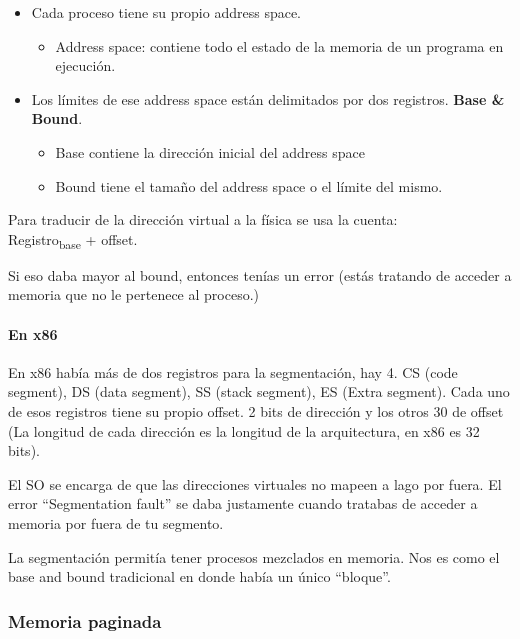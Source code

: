 \documentclass{article}
\begin{document}
\begin{itemize}
\item
  Cada proceso tiene su propio address space.

  \begin{itemize}
  \item
    Address space: contiene todo el estado de la memoria de un programa
    en ejecución.
  \end{itemize}
\item
  Los límites de ese address space están delimitados por dos registros.
  \textbf{Base \& Bound}.

  \begin{itemize}
  \item
    Base contiene la dirección inicial del address space
  \item
    Bound tiene el tamaño del address space o el límite del mismo.
  \end{itemize}
\end{itemize}

Para traducir de la dirección virtual a la física se usa la cuenta:\\
Registro\textsubscript{base} + offset.

Si eso daba mayor al bound, entonces tenías un error (estás tratando de
acceder a memoria que no le pertenece al proceso.)

\paragraph{En x86}\label{en-x86}

En x86 había más de dos registros para la segmentación, hay 4. CS (code
segment), DS (data segment), SS (stack segment), ES (Extra segment).
Cada uno de esos registros tiene su propio offset. 2 bits de dirección y
los otros 30 de offset (La longitud de cada dirección es la longitud de
la arquitectura, en x86 es 32 bits).

El SO se encarga de que las direcciones virtuales no mapeen a lago por
fuera. El error ``Segmentation fault'' se daba justamente cuando
tratabas de acceder a memoria por fuera de tu segmento.

La segmentación permitía tener procesos mezclados en memoria. Nos es
como el base and bound tradicional en donde había un único ``bloque''.

\subsubsection{Memoria paginada}\label{memoria-paginada}
\end{document}
